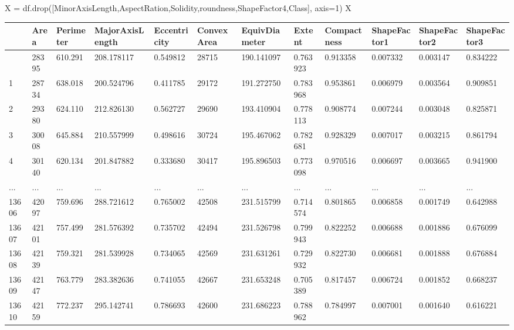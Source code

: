 \documentclass[
  letterpaper,
]{krantz}
\makeatletter
\newenvironment{Shaded}{\begin{snugshade}}{\end{snugshade}}
\newcommand{\DecValTok}[1]{\textcolor[rgb]{0.68,0.00,0.00}{#1}}
\newcommand{\NormalTok}[1]{\textcolor[rgb]{0.00,0.23,0.31}{#1}}
\newcommand{\OperatorTok}[1]{\textcolor[rgb]{0.37,0.37,0.37}{#1}}
\newcommand{\StringTok}[1]{\textcolor[rgb]{0.13,0.47,0.30}{#1}}
\newenvironment{kframe}{%
\medskip{}
\setlength{\fboxsep}{.8em}
 \def\at@end@of@kframe{}%
 \ifinner\ifhmode%
  \def\at@end@of@kframe{\end{minipage}}%
  \begin{minipage}{\columnwidth}%
 \fi\fi%
 \def\FrameCommand##1{\hskip\@totalleftmargin \hskip-\fboxsep
 \colorbox{shadecolor}{##1}\hskip-\fboxsep
     \hskip-\linewidth \hskip-\@totalleftmargin \hskip\columnwidth}%
 \MakeFramed {\advance\hsize-\width
   \@totalleftmargin\z@ \linewidth\hsize
   \@setminipage}}%
 {\par\unskip\endMakeFramed%
 \at@end@of@kframe}
\renewenvironment{Shaded}{\begin{kframe}}{\end{kframe}}
\makeatother
\begin{document}
\begin{Shaded}
\begin{Highlighting}[]
\NormalTok{X }\OperatorTok{=}\NormalTok{ df.drop([}\StringTok{\textquotesingle{}MinorAxisLength\textquotesingle{}}\NormalTok{,}\StringTok{\textquotesingle{}AspectRation\textquotesingle{}}\NormalTok{,}\StringTok{\textquotesingle{}Solidity\textquotesingle{}}\NormalTok{,}\StringTok{\textquotesingle{}roundness\textquotesingle{}}\NormalTok{,}\StringTok{\textquotesingle{}ShapeFactor4\textquotesingle{}}\NormalTok{,}\StringTok{\textquotesingle{}Class\textquotesingle{}}\NormalTok{], axis}\OperatorTok{=}\DecValTok{1}\NormalTok{)}
\NormalTok{X}
\end{Highlighting}
\end{Shaded}

\begin{longtable}[]{@{}llllllllllll@{}}
\toprule\noalign{}
& Area & Perimeter & MajorAxisLength & Eccentricity & ConvexArea &
EquivDiameter & Extent & Compactness & ShapeFactor1 & ShapeFactor2 &
ShapeFactor3 \\
\midrule\noalign{}
\endhead
\bottomrule\noalign{}
\endlastfoot
0 & 28395 & 610.291 & 208.178117 & 0.549812 & 28715 & 190.141097 &
0.763923 & 0.913358 & 0.007332 & 0.003147 & 0.834222 \\
1 & 28734 & 638.018 & 200.524796 & 0.411785 & 29172 & 191.272750 &
0.783968 & 0.953861 & 0.006979 & 0.003564 & 0.909851 \\
2 & 29380 & 624.110 & 212.826130 & 0.562727 & 29690 & 193.410904 &
0.778113 & 0.908774 & 0.007244 & 0.003048 & 0.825871 \\
3 & 30008 & 645.884 & 210.557999 & 0.498616 & 30724 & 195.467062 &
0.782681 & 0.928329 & 0.007017 & 0.003215 & 0.861794 \\
4 & 30140 & 620.134 & 201.847882 & 0.333680 & 30417 & 195.896503 &
0.773098 & 0.970516 & 0.006697 & 0.003665 & 0.941900 \\
... & ... & ... & ... & ... & ... & ... & ... & ... & ... & ... & ... \\
13606 & 42097 & 759.696 & 288.721612 & 0.765002 & 42508 & 231.515799 &
0.714574 & 0.801865 & 0.006858 & 0.001749 & 0.642988 \\
13607 & 42101 & 757.499 & 281.576392 & 0.735702 & 42494 & 231.526798 &
0.799943 & 0.822252 & 0.006688 & 0.001886 & 0.676099 \\
13608 & 42139 & 759.321 & 281.539928 & 0.734065 & 42569 & 231.631261 &
0.729932 & 0.822730 & 0.006681 & 0.001888 & 0.676884 \\
13609 & 42147 & 763.779 & 283.382636 & 0.741055 & 42667 & 231.653248 &
0.705389 & 0.817457 & 0.006724 & 0.001852 & 0.668237 \\
13610 & 42159 & 772.237 & 295.142741 & 0.786693 & 42600 & 231.686223 &
0.788962 & 0.784997 & 0.007001 & 0.001640 & 0.616221 \\
\end{longtable}
\end{document}
